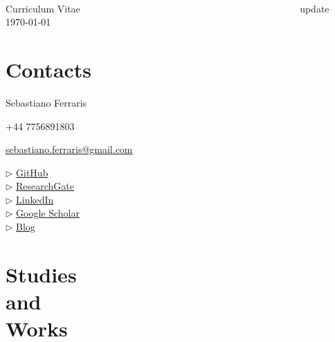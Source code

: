\documentclass[margin,line]{resume}
\begin{document}
~
\vspace{-2.0cm}

{\sc \Large Curriculum Vitae ~~~~~~~~~~~~~~~~~~~~~~~~~~~~~~~~~~~~~~~~~~~~ \scriptsize update \today}
\begin{resume}
    \vspace{0.5cm}
    
    
    \section{\mysidestyle Contacts}
    
    Sebastiano Ferraris 
    
    +44 7756891803
    
    \href{mailto:sebastiano.ferraris@gmail.com}{sebastiano.ferraris@gmail.com}

    $\triangleright$ \href{http://www.github.com/SebastianoF}{GitHub}\\
    $\triangleright$ \href{https://www.researchgate.net/profile/Sebastiano_Ferraris}{ResearchGate}\\
    $\triangleright$ \href{https://www.linkedin.com/in/ibis-redibis/}{LinkedIn}\\
    $\triangleright$ \href{https://scholar.google.com/citations?user=1tAeAI0AAAAJ&hl=en}{Google Scholar}\\
    $\triangleright$ \href{https://geospatial.netlify.app/posts/}{Blog}

\section{\mysidestyle Studies \\ and \\ Works}



\end{resume}
\end{document}
